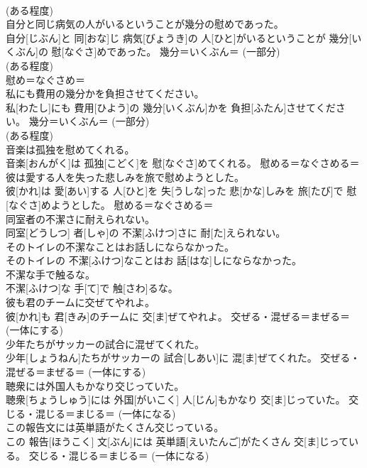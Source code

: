 \documentclass[8pt]{extreport}
\begin{document}
\begin{CJK}{UTF8}{min}
\\	(ある程度) 
\\	自分と同じ病気の人がいるということが幾分の慰めであった。	
\\	自分[じぶん]と 同[おな]じ 病気[びょうき]の 人[ひと]がいるということが 幾分[いくぶん]の 慰[なぐさ]めであった。	幾分＝いくぶん＝ (一部分) 
\\	(ある程度) 
\\	慰め＝なぐさめ＝ 
\\	私にも費用の幾分かを負担させてください。	
\\	私[わたし]にも 費用[ひよう]の 幾分[いくぶん]かを 負担[ふたん]させてください。	幾分＝いくぶん＝ (一部分) 
\\	(ある程度) 
\\	音楽は孤独を慰めてくれる。	
\\	音楽[おんがく]は 孤独[こどく]を 慰[なぐさ]めてくれる。	慰める＝なぐさめる＝ 
\\	彼は愛する人を失った悲しみを旅で慰めようとした。	
\\	彼[かれ]は 愛[あい]する 人[ひと]を 失[うしな]った 悲[かな]しみを 旅[たび]で 慰[なぐさ]めようとした。	慰める＝なぐさめる＝ 
\\	同室者の不潔さに耐えられない。	
\\	同室[どうしつ] 者[しゃ]の 不潔[ふけつ]さに 耐[た]えられない。	
\\	そのトイレの不潔なことはお話しにならなかった。	
\\	そのトイレの 不潔[ふけつ]なことはお 話[はな]しにならなかった。	
\\	不潔な手で触るな。	
\\	不潔[ふけつ]な 手[て]で 触[さわ]るな。	
\\	彼も君のチームに交ぜてやれよ。	
\\	彼[かれ]も 君[きみ]のチームに 交[ま]ぜてやれよ。	交ぜる・混ぜる＝まぜる＝ (一体にする) 
\\	少年たちがサッカーの試合に混ぜてくれた。	
\\	少年[しょうねん]たちがサッカーの 試合[しあい]に 混[ま]ぜてくれた。	交ぜる・混ぜる＝まぜる＝ (一体にする) 
\\	聴衆には外国人もかなり交じっていた。	
\\	聴衆[ちょうしゅう]には 外国[がいこく] 人[じん]もかなり 交[ま]じっていた。	交じる・混じる＝まじる＝ (一体になる) 
\\	この報告文には英単語がたくさん交じっている。	
\\	この 報告[ほうこく] 文[ぶん]には 英単語[えいたんご]がたくさん 交[ま]じっている。	交じる・混じる＝まじる＝ (一体になる) 

\end{CJK}
\end{document}
